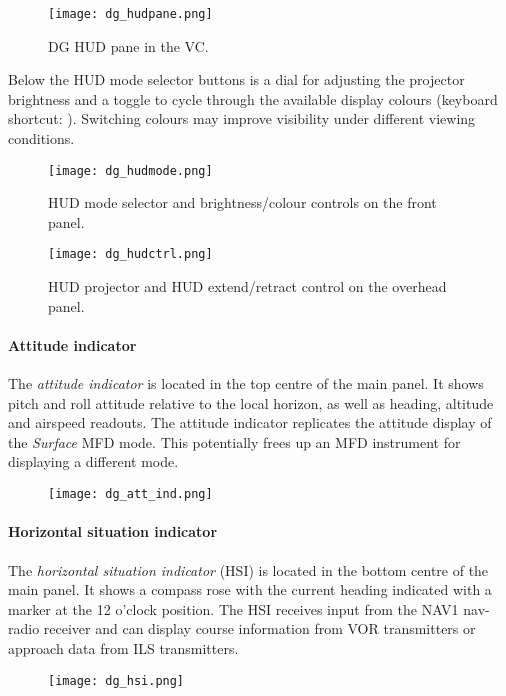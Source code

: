\documentclass[Orbiter User Manual.tex]{subfiles}
\begin{document}
\begin{figure}[H]
  \centering
  \texttt{[image: dg\_hudpane.png]}
  \caption{DG HUD pane in the VC.}
\end{figure}

\noindent
Below the HUD mode selector buttons is a dial for adjusting the projector brightness and a toggle to cycle through the available display colours (keyboard shortcut: \Alt{}). Switching colours may improve visibility under different viewing conditions.

\begin{figure}[H]
  \centering
  \texttt{[image: dg\_hudmode.png]}
  \caption{HUD mode selector and brightness/colour controls on the front panel.}
\end{figure}

\begin{figure}[H]
  \centering
  \texttt{[image: dg\_hudctrl.png]}
  \caption{HUD projector and HUD extend/retract control on the overhead panel.}
\end{figure}


\paragraph{Attitude indicator}
The \textit{attitude indicator} is located in the top centre of the main panel. It shows pitch and roll attitude relative to the local horizon, as well as heading, altitude and airspeed readouts. The attitude indicator replicates the attitude display of the \textit{Surface} MFD mode. This potentially frees up an MFD instrument for displaying a different mode.

\begin{figure}[H]
  \centering
  \texttt{[image: dg\_att\_ind.png]}
\end{figure}

\paragraph{Horizontal situation indicator}
The \textit{horizontal situation indicator} (HSI) is located in the bottom centre of the main panel. It shows a compass rose with the current heading indicated with a marker at the 12 o'clock position. The HSI receives input from the NAV1 nav-radio receiver and can display course information from VOR transmitters or approach data from ILS transmitters.

\begin{figure}[H]
  \centering
  \texttt{[image: dg\_hsi.png]}
\end{figure}
\end{document}
